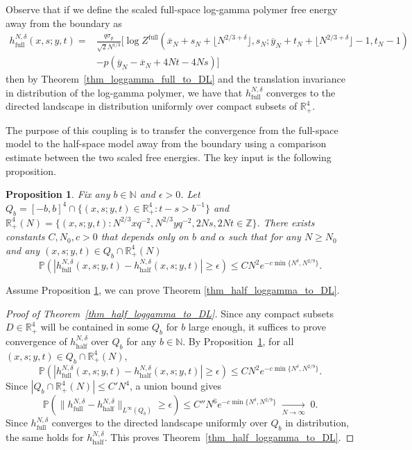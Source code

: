 \documentclass[11pt]{article}
\newtheorem{proposition}[theorem]{Proposition}
\theoremstyle{definition}
\newcommand{\R}{\mathbb{R}}
\newcommand{\Z}{\mathbb{Z}}
\newcommand{\N}{\mathbb{N}}
\newcommand{\Prob}{\mathbb{P}}
\begin{document}
Observe that if we define the scaled full-space log-gamma polymer free energy away from the boundary as
\begin{equation}\label{eq:Lfullk_loggamma_def}
\begin{split}
h_{\mathrm{full}}^{N, \delta}(x,s;y,t)
=&\frac{q\sigma_p}{\sqrt{2}N^{1/3}}\bigg[ \log Z^{\mathrm{full}}(\overline{x}_N + s_N+\lfloor N^{2/3+\delta}\rfloor, s_N;\overline{y}_N + t_N + \lfloor N^{2/3+\delta}\rfloor -1, t_N-1)\\
     &-p\left( \overline{y}_N - \overline{x}_N + 4Nt-4Ns\right)\bigg]
\end{split}
\end{equation}
then by Theorem~\ref{thm_loggamma_full_to_DL} and the translation invariance in distribution of the log-gamma polymer, we have that $h_{\mathrm{full}}^{N,\delta}$ converges to the directed landscape in distribution uniformly over compact subsets of $\R_+^4$.


The purpose of this coupling is to transfer the convergence from the full-space model to the half-space model away from the boundary using a comparison estimate between the two scaled free energies. The key input is the following proposition.

\begin{proposition}\label{prop:diff_loggamma}
    Fix any $b \in \N$ and $\epsilon > 0$. Let $Q_b = [-b,b]^4 \cap \{(x,s;y,t) \in \R_+^4: t-s > b^{-1}\}$ and $\R_{+}^4(N) = \{(x,s;y,t): N^{2/3}xq^{-2}, N^{2/3}yq^{-2}, 2Ns,2Nt \in \Z\}$. There exists constants $C,N_0,c > 0$ that depends only on $b$ and $\alpha$ such that for any $N \geq N_0$ and any $(x,s;y,t) \in Q_b \cap \R_{+}^4(N)$
\begin{equation}\label{eq:pointwise_exp_decay}
\Prob \left( \left|h_{\mathrm{full}}^{N,\delta}(x,s;y,t) - h_{\mathrm{half}}^{N,\delta}(x,s;y,t) \right|\geq \epsilon \right) \leq CN^2e^{-c\min\{N^{\delta}, N^{2/9}\}}.
\end{equation}
\end{proposition}

Assume Proposition \ref{prop:diff_loggamma}, we can prove Theorem \ref{thm_half_loggamma_to_DL}.
\begin{proof}[Proof of Theorem~\ref{thm_half_loggamma_to_DL}]
Since any compact subsets $D \in \R^4_+$ will be contained in some $Q_b$ for $b$ large enough, it suffices to prove convergence of $h_{\mathrm{half}}^{N,\delta}$ over $Q_b$ for any $b \in \N$. By Proposition~\ref{prop:diff_loggamma},
for all $(x,s;y,t)\in Q_b\cap\R_+^4(N)$,
\[
\Prob\!\left(
\left|h_{\mathrm{full}}^{N,\delta}(x,s;y,t)
-
h_{\mathrm{half}}^{N,\delta}(x,s;y,t)\right|
\ge \epsilon
\right)
\le C N^2e^{-c\min\{N^{\delta}, N^{2/9}\}}.
\]
Since $|Q_b\cap\R_+^4(N)|\le C' N^4$, a union bound gives
\[
\Prob\!\left(
\bigl\|h_{\mathrm{full}}^{N,\delta}-h_{\mathrm{half}}^{N,\delta}\bigr\|_{L^\infty(Q_b)}
\ge \epsilon
\right)
\le C'' N^6 e^{-c\min\{N^{\delta}, N^{2/9}\}}
\;\xrightarrow[N\to\infty]{}\;0.
\]
Since
$h_{\mathrm{full}}^{N,\delta}$ converges to the directed landscape
uniformly over $Q_b$ in distribution, the same holds for
$h_{\mathrm{half}}^{N,\delta}$. This proves
Theorem~\ref{thm_half_loggamma_to_DL}.
\end{proof}
\end{document}
